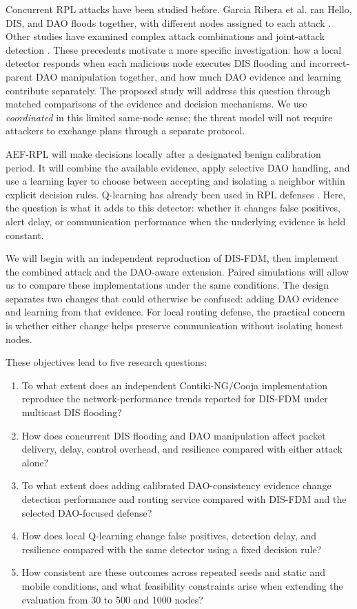 \documentclass[journal]{IEEEtran}
\begin{document}
Concurrent RPL attacks have been studied before. Garcia Ribera et al. ran Hello, DIS, and DAO floods together, with different nodes assigned to each attack \cite{garciaribera2022}. Other studies have examined complex attack combinations and joint-attack detection \cite{alsukayti2023,de2rarpl2024,abdulkareem2024}. These precedents motivate a more specific investigation: how a local detector responds when each malicious node executes DIS flooding and incorrect-parent DAO manipulation together, and how much DAO evidence and learning contribute separately. The proposed study will address this question through matched comparisons of the evidence and decision mechanisms. We use \emph{coordinated} in this limited same-node sense; the threat model will not require attackers to exchange plans through a separate protocol.

AEF-RPL will make decisions locally after a designated benign calibration period. It will combine the available evidence, apply selective DAO handling, and use a learning layer to choose between accepting and isolating a neighbor within explicit decision rules. Q-learning has already been used in RPL defenses \cite{qsecrpl2023,itrpl2024}. Here, the question is what it adds to this detector: whether it changes false positives, alert delay, or communication performance when the underlying evidence is held constant.

We will begin with an independent reproduction of DIS-FDM, then implement the combined attack and the DAO-aware extension. Paired simulations will allow us to compare these implementations under the same conditions. The design separates two changes that could otherwise be confused: adding DAO evidence and learning from that evidence. For local routing defense, the practical concern is whether either change helps preserve communication without isolating honest nodes.

These objectives lead to five research questions:
\begin{enumerate}
\item[\emph{RQ1:}] To what extent does an independent Contiki-NG/Cooja implementation reproduce the network-performance trends reported for DIS-FDM under multicast DIS flooding?
\item[\emph{RQ2:}] How does concurrent DIS flooding and DAO manipulation affect packet delivery, delay, control overhead, and resilience compared with either attack alone?
\item[\emph{RQ3:}] To what extent does adding calibrated DAO-consistency evidence change detection performance and routing service compared with DIS-FDM and the selected DAO-focused defense?
\item[\emph{RQ4:}] How does local Q-learning change false positives, detection delay, and resilience compared with the same detector using a fixed decision rule?
\item[\emph{RQ5:}] How consistent are these outcomes across repeated seeds and static and mobile conditions, and what feasibility constraints arise when extending the evaluation from 30 to 500 and 1000 nodes?
\end{enumerate}
\end{document}
